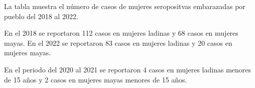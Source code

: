 La tabla muestra el número de casos de mujeres seropositvas embarazadas por pueblo del 2018 al 2022.  

En el 2018 se reportaron 112 casos en mujeres ladinas y 68 casos en mujeres mayas. En el 2022 se reportaron 83 casos en mujeres ladinas y 20 casos en mujeres mayas. 

En el periodo del 2020 al 2021 se reportaron 4 casos en mujeres ladinas menores de 15 años y 2 casos en mujeres mayas menores de 15 años. 